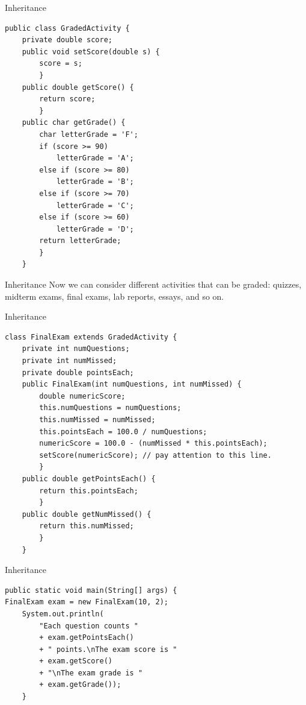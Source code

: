 \documentclass[11pt]{beamer}
\begin{document}
\begin{frame}[fragile]{Inheritance}
    \begin{lstlisting}[basicstyle=\ttfamily\footnotesize]
public class GradedActivity {
    private double score;
    public void setScore(double s) {
        score = s;
        }
    public double getScore() {
        return score;
        }
    public char getGrade() {
        char letterGrade = 'F';
        if (score >= 90)
            letterGrade = 'A';
        else if (score >= 80)
            letterGrade = 'B';
        else if (score >= 70)
            letterGrade = 'C';
        else if (score >= 60)
            letterGrade = 'D';
        return letterGrade;
        }
    }
    \end{lstlisting}
\end{frame}

\begin{frame}[fragile]{Inheritance}
    Now we can consider different activities that can be graded: quizzes, midterm exams, final exams, lab reports, essays, and so on.
\end{frame}

\begin{frame}[fragile]{Inheritance}
\begin{lstlisting}[basicstyle=\ttfamily\footnotesize]
class FinalExam extends GradedActivity {
	private int numQuestions;
	private int numMissed;
	private double pointsEach;
	public FinalExam(int numQuestions, int numMissed) {
		double numericScore;
		this.numQuestions = numQuestions;
		this.numMissed = numMissed;
		this.pointsEach = 100.0 / numQuestions;
		numericScore = 100.0 - (numMissed * this.pointsEach);
		setScore(numericScore); // pay attention to this line.
		}
	public double getPointsEach() {
		return this.pointsEach;
		}
	public double getNumMissed() {
		return this.numMissed;
		}
	}
\end{lstlisting}
\end{frame}

\begin{frame}[fragile]{Inheritance}
    \begin{lstlisting}
public static void main(String[] args) {
FinalExam exam = new FinalExam(10, 2);
    System.out.println(
        "Each question counts " 
        + exam.getPointsEach()
        + " points.\nThe exam score is "
        + exam.getScore()
        + "\nThe exam grade is "
        + exam.getGrade());
    }
    \end{lstlisting}    
\end{frame}
\end{document}

